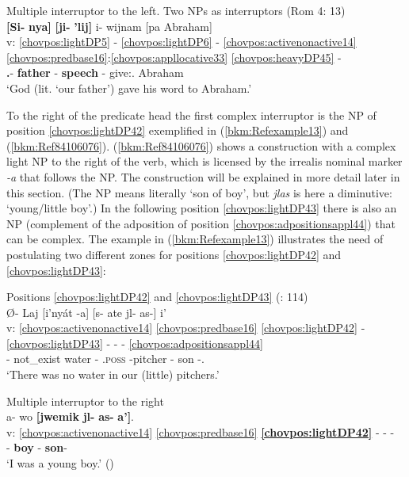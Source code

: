 \documentclass[output=paper]{langscibook}
\begin{document}
\ea\label{bkm:Ref84096642}Multiple interruptor to the left. Two NPs as interruptors (Rom 4: 13) \\ 
\glll {} \textbf{[Si-} \textbf{nya]} \textbf{[ji-} \textbf{'lij]} i- wijnam [pa Abraham] \\
v: \ref{chovpos:lightDP5} - \ref{chovpos:lightDP6} - \ref{chovpos:activenonactive14} \ref{chovpos:predbase16}:\ref{chovpos:appllocative33} \ref{chovpos:heavyDP45} - \\
{} \textbf{\First\Pl.\Poss{}}- \textbf{father} \Third\Poss{}- \textbf{speech} \Third{}- give:\Ap.\Loc{} \Dem{} Abraham\\ 
\glt `God (lit. `our father') gave his word to Abraham.'
\z 

To the right of the predicate head the first complex interruptor is the NP of position \ref{chovpos:lightDP42} exemplified in (\ref{bkm:Refexample13}) and (\ref{bkm:Ref84106076}). (\ref{bkm:Ref84106076}) shows a construction with a complex light NP to the right of the verb, which is licensed by the irrealis nominal marker \textit{-a} that follows the NP. The construction will be explained in more detail later in this section. (The NP means literally `son of boy', but \textit{jlas} is here a diminutive: `young/little boy'.) In the following position \ref{chovpos:lightDP43} there is also an NP (complement of the adposition of position \ref{chovpos:adpositionsappl44}) that can be complex. The example in (\ref{bkm:Refexample13}) illustrates the need of postulating two different zones for positions \ref{chovpos:lightDP42} and \ref{chovpos:lightDP43}: 

\ea \label{bkm:Refexample13} Positions \ref{chovpos:lightDP42} and \ref{chovpos:lightDP43} (\citealt{DraysonGomez2000}: 114) \\
\glll {} Ø- Laj [i'nyát -a] [s- ate jl{}- as-] i' \\
    v: \ref{chovpos:activenonactive14} \ref{chovpos:predbase16} \ref{chovpos:lightDP42} - \ref{chovpos:lightDP43} - - - \ref{chovpos:adpositionsappl44} \\
    {} \Third{}- not\_exist water -\Irr{} \First\Pl{}.\textsc{poss}{} -pitcher \Third\Poss{}- son -\Ap.\Loc{} \\ 
\glt `There was no water in our (little) pitchers.'
\z

\ea\label{bkm:Ref84106076} Multiple interruptor to the right \\
\glll {} a- wo \textbf{[jwemik} \textbf{jl-} \textbf{as-} \textbf{a']}.\\ 
v: \ref{chovpos:activenonactive14} \ref{chovpos:predbase16} \textbf{\ref{chovpos:lightDP42}} - - - \\ 
{} \First{}- \Lv{} \textbf{boy} \textbf{\Third\Poss{}}- \textbf{son}- \textbf{\Irr{}} \\
\glt `I was a young boy.' (\citealt[122]{DraysonGomez2000})
\z 
\end{document}
